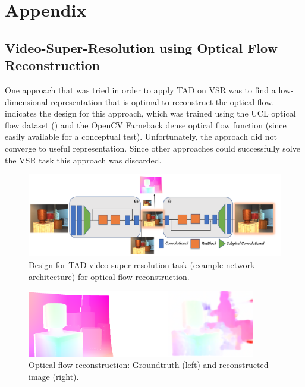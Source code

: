 \newpage
\section{Appendix}
\label{sec:Appendix}

\subsection*{Video-Super-Resolution using Optical Flow Reconstruction}
One approach that was tried in order to apply \ac{TAD} on \ac{VSR} was to find a
low-dimensional representation that is optimal to reconstruct the optical flow.
 indicates the design for this
approach, which was trained using the UCL optical flow dataset (\cite{ADAEMFOF})
and the OpenCV Farneback dense optical flow function (since easily available
for a conceptual test).
Unfortunately, the approach did not converge to useful representation. Since
other approaches could successfully solve the \ac{VSR} task this approach was
discarded.

\begin{figure}[!htbp]
	\centering
	\includegraphics[width=14cm]{figures/architecture_video_flow}
	\caption{Design for \ac{TAD} video super-resolution task (example network
  architecture) for optical flow reconstruction. }
  \label{fig:architecture_video_flow}
\end{figure}

\begin{figure}[!htbp]
	\centering
	\includegraphics[width=10cm]{figures/flow}
	\caption{Optical flow reconstruction: Groundtruth (left) and reconstructed
  image (right).}
  \label{fig:flow}
\end{figure}

